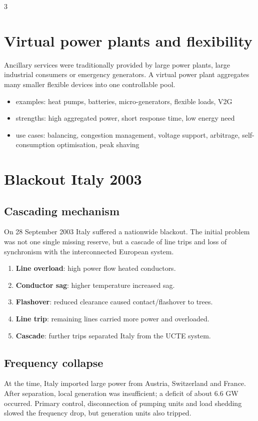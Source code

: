 \documentclass[9pt, landscape, a4paper]{article}
\begin{document}
\begin{multicols*}{3}
\section{Virtual power plants and flexibility}
Ancillary services were traditionally provided by large power plants, large
industrial consumers or emergency generators. A virtual power plant aggregates
many smaller flexible devices into one controllable pool.

\begin{itemize}
  \item examples: heat pumps, batteries, micro-generators, flexible loads, V2G
  \item strengths: high aggregated power, short response time, low energy need
  \item use cases: balancing, congestion management, voltage support,
        arbitrage, self-consumption optimisation, peak shaving
\end{itemize}

\section{Blackout Italy 2003}
\subsection{Cascading mechanism}
On 28 September 2003 Italy suffered a nationwide blackout. The initial problem
was not one single missing reserve, but a cascade of line trips and loss of
synchronism with the interconnected European system.

\begin{enumerate}[label=\arabic*.]
  \item \textbf{Line overload}: high power flow heated conductors.
  \item \textbf{Conductor sag}: higher temperature increased sag.
  \item \textbf{Flashover}: reduced clearance caused contact/flashover to trees.
  \item \textbf{Line trip}: remaining lines carried more power and overloaded.
  \item \textbf{Cascade}: further trips separated Italy from the UCTE system.
\end{enumerate}

\subsection{Frequency collapse}
At the time, Italy imported large power from Austria, Switzerland and France.
After separation, local generation was insufficient; a deficit of about
6.6 GW occurred. Primary control, disconnection of pumping units and load
shedding slowed the frequency drop, but generation units also tripped.


\end{multicols*}
\end{document}
